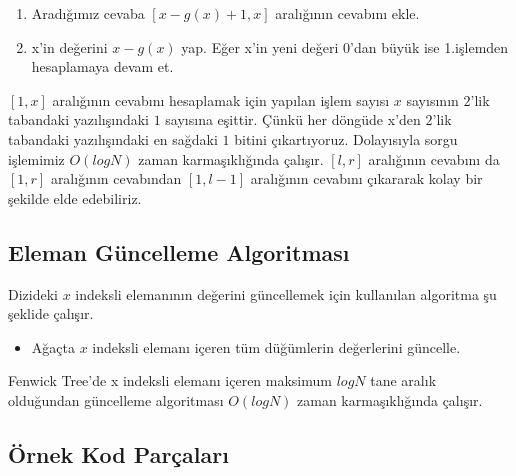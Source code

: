 \documentclass[12pt]{article}
\begin{document}
    \begin{enumerate}
        \item Arad{\i}\u{g}{\i}m{\i}z cevaba $[x - g(x) + 1,x]$ aral{\i}\u{g}{\i}n{\i}n cevab{\i}n{\i} ekle.
        \item x'in de\u{g}erini $x - g(x)$ yap. E\u{g}er x'in yeni de\u{g}eri $0$'dan b\"{u}y\"{u}k ise 1.i\c{s}lemden hesaplamaya devam et.  
    \end{enumerate}
    
    $[1,x]$ aral{\i}\u{g}{\i}n{\i}n cevab{\i}n{\i} hesaplamak i\c{c}in yap{\i}lan i\c{s}lem say{\i}s{\i} $x$ say{\i}s{\i}n{\i}n $2$'lik tabandaki yaz{\i}l{\i}\c{s}{\i}ndaki $1$ say{\i}s{\i}na e\c{s}ittir. \c{C}\"{u}nk\"{u} her d\"{o}ng\"{u}de x'den $2$'lik tabandaki yaz{\i}l{\i}\c{s}{\i}ndaki en sa\u{g}daki $1$ bitini \c{c}{\i}kart{\i}yoruz. Dolay{\i}s{\i}yla sorgu i\c{s}lemimiz $O(logN)$ zaman karma\c{s}{\i}kl{\i}\u{g}{\i}nda \c{c}al{\i}\c{s}{\i}r. $[l,r]$ aral{\i}\u{g}{\i}n{\i}n cevab{\i}n{\i} da $[1,r]$ aral{\i}\u{g}{\i}n{\i}n cevab{\i}ndan $[1,l - 1]$ aral{\i}\u{g}{\i}n{\i}n cevab{\i}n{\i} \c{c}{\i}kararak kolay bir \c{s}ekilde elde edebiliriz.
    
    
    \subsection{Eleman G\"{u}ncelleme Algoritmas{\i}}
    
    Dizideki $x$ indeksli eleman{\i}n{\i}n de\u{g}erini g\"{u}ncellemek  i\c{c}in kullan{\i}lan algoritma \c{s}u \c{s}eklide \c{c}al{\i}\c{s}{\i}r.
    
    \begin{itemize}
        \item A\u{g}a\c{c}ta $x$ indeksli eleman{\i} i\c{c}eren t\"{u}m d\"{u}\u{g}\"{u}mlerin de\u{g}erlerini g\"{u}ncelle.
    \end{itemize}
    
    Fenwick Tree'de x indeksli eleman{\i} i\c{c}eren maksimum $logN$ tane aral{\i}k oldu\u{g}undan g\"{u}ncelleme algoritmas{\i} $O(logN)$ zaman karma\c{s}{\i}kl{\i}\u{g}{\i}nda \c{c}al{\i}\c{s}{\i}r.
    
    \clearpage
    
    \subsection{\"{O}rnek Kod Par\c{c}alar{\i}}
    
\end{document}
